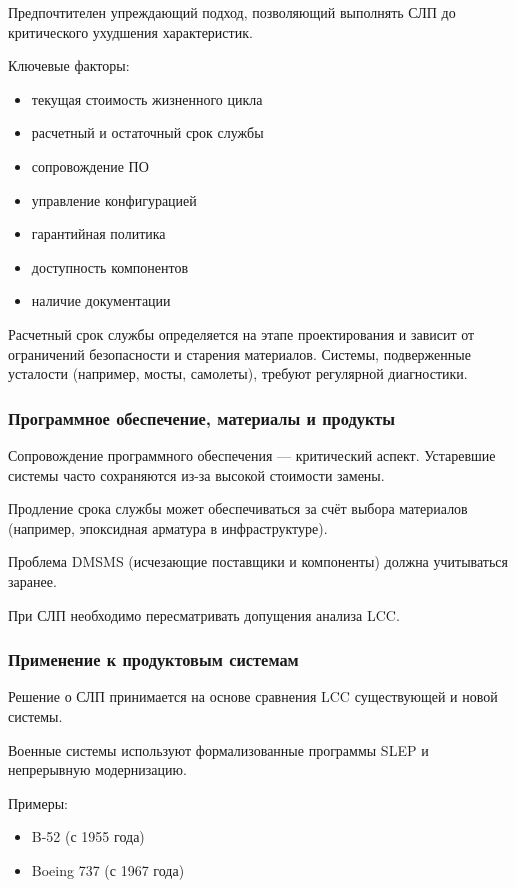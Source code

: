 \documentclass[14pt,a4paper]{extarticle}
\begin{document}
Предпочтителен упреждающий подход, позволяющий выполнять СЛП до критического ухудшения характеристик.

Ключевые факторы:

\begin{itemize}
\item текущая стоимость жизненного цикла
\item расчетный и остаточный срок службы
\item сопровождение ПО
\item управление конфигурацией
\item гарантийная политика
\item доступность компонентов
\item наличие документации
\end{itemize}

Расчетный срок службы определяется на этапе проектирования и зависит от ограничений безопасности и старения материалов. Системы, подверженные усталости (например, мосты, самолеты), требуют регулярной диагностики.

\subsubsection{Программное обеспечение, материалы и продукты}

Сопровождение программного обеспечения — критический аспект. Устаревшие системы часто сохраняются из-за высокой стоимости замены.

Продление срока службы может обеспечиваться за счёт выбора материалов (например, эпоксидная арматура в инфраструктуре).

Проблема DMSMS (исчезающие поставщики и компоненты) должна учитываться заранее.

При СЛП необходимо пересматривать допущения анализа LCC.

\subsubsection{Применение к продуктовым системам}

Решение о СЛП принимается на основе сравнения LCC существующей и новой системы.

Военные системы используют формализованные программы SLEP и непрерывную модернизацию.

Примеры:

\begin{itemize}
\item B-52 (с 1955 года)
\item Boeing 737 (с 1967 года)
\end{itemize}
\end{document}
